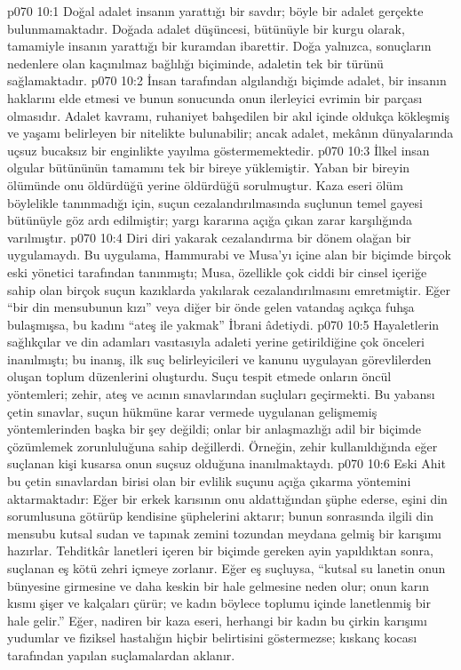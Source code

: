 \vs p070 10:1 Doğal adalet insanın yarattığı bir savdır; böyle bir adalet gerçekte bulunmamaktadır. Doğada adalet düşüncesi, bütünüyle bir kurgu olarak, tamamiyle insanın yarattığı bir kuramdan ibarettir. Doğa yalnızca, sonuçların nedenlere olan kaçınılmaz bağlılığı biçiminde, adaletin tek bir türünü sağlamaktadır.
\vs p070 10:2 İnsan tarafından algılandığı biçimde adalet, bir insanın haklarını elde etmesi ve bunun sonucunda onun ilerleyici evrimin bir parçası olmasıdır. Adalet kavramı, ruhaniyet bahşedilen bir akıl içinde oldukça kökleşmiş ve yaşamı belirleyen bir nitelikte bulunabilir; ancak adalet, mekânın dünyalarında uçsuz bucaksız bir enginlikte yayılma göstermemektedir.
\vs p070 10:3 İlkel insan olgular bütününün tamamını tek bir bireye yüklemiştir. Yaban bir bireyin ölümünde onu  öldürdüğü yerine  öldürdüğü sorulmuştur. Kaza eseri ölüm böylelikle tanınmadığı için, suçun cezalandırılmasında suçlunun temel gayesi bütünüyle göz ardı edilmiştir; yargı kararına açığa çıkan zarar karşılığında varılmıştır.
\vs p070 10:4 Diri diri yakarak cezalandırma bir dönem olağan bir uygulamaydı. Bu uygulama, Hammurabi ve Musa’yı içine alan bir biçimde birçok eski yönetici tarafından tanınmıştı; Musa, özellikle çok ciddi bir cinsel içeriğe sahip olan birçok suçun kazıklarda yakılarak cezalandırılmasını emretmiştir. Eğer “bir din mensubunun kızı” veya diğer bir önde gelen vatandaş açıkça fuhşa bulaşmışsa, bu kadını “ateş ile yakmak” İbrani âdetiydi.
\vs p070 10:5 Hayaletlerin sağlıkçılar ve din adamları vasıtasıyla adaleti yerine getirildiğine çok önceleri inanılmıştı; bu inanış, ilk suç belirleyicileri ve kanunu uygulayan görevlilerden oluşan toplum düzenlerini oluşturdu. Suçu tespit etmede onların öncül yöntemleri; zehir, ateş ve acının sınavlarından suçluları geçirmekti. Bu yabansı çetin sınavlar, suçun hükmüne karar vermede uygulanan gelişmemiş yöntemlerinden başka bir şey değildi; onlar bir anlaşmazlığı adil bir biçimde çözümlemek zorunluluğuna sahip değillerdi. Örneğin, zehir kullanıldığında eğer suçlanan kişi kusarsa onun suçsuz olduğuna inanılmaktaydı.
\vs p070 10:6 Eski Ahit bu çetin sınavlardan birisi olan bir evlilik suçunu açığa çıkarma yöntemini aktarmaktadır: Eğer bir erkek karısının onu aldattığından şüphe ederse, eşini din sorumlusuna götürüp kendisine şüphelerini aktarır; bunun sonrasında ilgili din mensubu kutsal sudan ve tapınak zemini tozundan meydana gelmiş bir karışımı hazırlar. Tehditkâr lanetleri içeren bir biçimde gereken ayin yapıldıktan sonra, suçlanan eş kötü zehri içmeye zorlanır. Eğer eş suçluysa, “kutsal su lanetin onun bünyesine girmesine ve daha keskin bir hale gelmesine neden olur; onun karın kısmı şişer ve kalçaları çürür; ve kadın böylece toplumu içinde lanetlenmiş bir hale gelir.” Eğer, nadiren bir kaza eseri, herhangi bir kadın bu çirkin karışımı yudumlar ve fiziksel hastalığın hiçbir belirtisini göstermezse; kıskanç kocası tarafından yapılan suçlamalardan aklanır.
